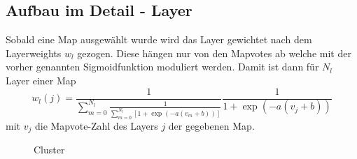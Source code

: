     \subsection{Aufbau im Detail - Layer}
    Sobald eine Map ausgewählt wurde wird das Layer gewichtet nach dem Layerweights $w_l$ gezogen. 
    Diese hängen nur von den Mapvotes ab welche mit der vorher genannten Sigmoidfunktion moduliert werden.
    Damit ist dann für $N_l$ Layer einer Map 
    \begin{equation}
        w_l(j) = \frac{1}{\sum_{m=0}^{N_l}\frac{1}{\sum_{m=0}^{N_l}\left[1+\exp\left(-a(v_m+b)\right)\right]}}\frac{1}{1+\exp\left(-a(v_j+b)\right)}
    \end{equation} 
    mit $v_j$ die Mapvote-Zahl des Layers $j$ der gegebenen Map.
    \begin{figure}[htbp]
    \caption{Cluster}
    \end{figure}